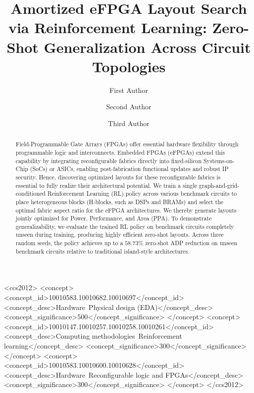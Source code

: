\documentclass[sigconf]{acmart}
\title{Amortized eFPGA Layout Search via Reinforcement Learning: Zero-Shot Generalization Across Circuit Topologies}
\author{First Author}
\affiliation{%
  \institution{University Name}
  \city{City, State}
  \country{Country}
}
\author{Second Author}
\affiliation{%
  \institution{University Name}
  \city{City, State}
  \country{Country}
}
\author{Third Author}
\affiliation{%
  \institution{University Name}
  \city{City, State}
  \country{Country}
}
\begin{document}
\begin{abstract}
Field-Programmable Gate Arrays (FPGAs) offer essential hardware flexibility
through programmable logic and interconnects. Embedded FPGAs (eFPGAs) extend
this capability by integrating reconfigurable fabrics directly into
fixed-silicon Systems-on-Chip (SoCs) or ASICs, enabling post-fabrication
functional updates and robust IP security. Hence, discovering optimized
layouts for these reconfigurable fabrics is essential to fully realize their
architectural potential. We train a single
graph-and-grid-conditioned Reinforcement Learning (RL) policy across various
benchmark circuits to place heterogeneous blocks (H-blocks, such as DSPs and
BRAMs) and select the optimal fabric aspect ratio for the eFPGA
architectures. We thereby generate layouts jointly optimized for Power,
Performance, and Area (PPA). To demonstrate generalizability, we evaluate
the trained RL policy on benchmark circuits completely unseen during
training, producing highly efficient zero-shot layouts. Across three random
seeds, the policy achieves up to a $58.73\%$ zero-shot ADP reduction on
unseen benchmark circuits relative to traditional island-style
architectures.
\end{abstract}


\begin{CCSXML}
<ccs2012>
   <concept>
       <concept_id>10010583.10010682.10010697</concept_id>
       <concept_desc>Hardware~Physical design (EDA)</concept_desc>
       <concept_significance>500</concept_significance>
       </concept>
   <concept>
       <concept_id>10010147.10010257.10010258.10010261</concept_id>
       <concept_desc>Computing methodologies~Reinforcement learning</concept_desc>
       <concept_significance>300</concept_significance>
       </concept>
   <concept>
       <concept_id>10010583.10010600.10010628</concept_id>
       <concept_desc>Hardware~Reconfigurable logic and FPGAs</concept_desc>
       <concept_significance>300</concept_significance>
       </concept>
 </ccs2012>
\end{CCSXML}


\maketitle
\end{document}
